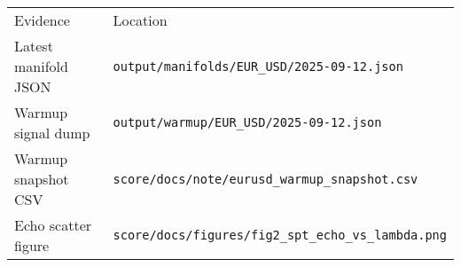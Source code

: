 \begin{tabular}{ll}
\toprule
Evidence & Location\\
Latest manifold JSON & \texttt{output/manifolds/EUR\_USD/2025-09-12.json}\\
Warmup signal dump & \texttt{output/warmup/EUR\_USD/2025-09-12.json}\\
Warmup snapshot CSV & \texttt{score/docs/note/eurusd\_warmup\_snapshot.csv}\\
Echo scatter figure & \texttt{score/docs/figures/fig2\_spt\_echo\_vs\_lambda.png}\\
\bottomrule
\end{tabular}
